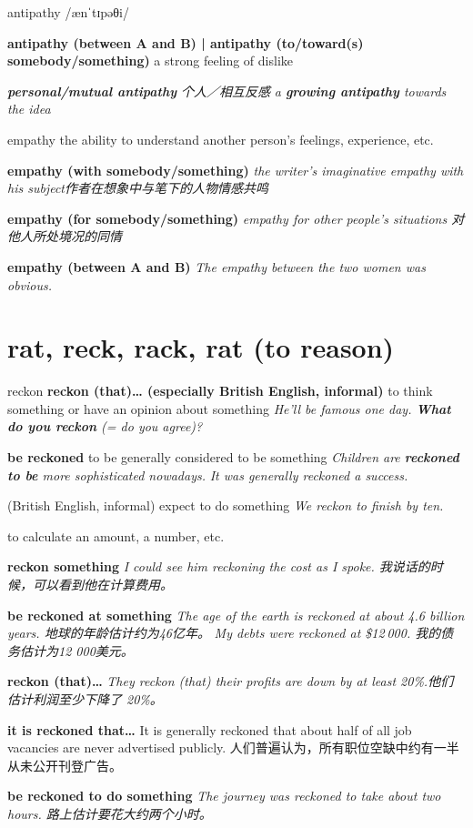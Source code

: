 \begin{DefWord}{antipathy}
    /ænˈtɪpəθi/

    \textbf{antipathy (between A and B) | antipathy (to/toward(s) somebody/something)} a strong feeling of dislike

    \textit{\textbf{personal/mutual antipathy} 个人／相互反感}
    \textit{a \textbf{growing antipathy} towards the idea}
\end{DefWord}

\begin{DefWord}{empathy}
    the ability to understand another person's feelings, experience, etc.

    \textbf{empathy (with somebody/something)} 
    \textit{the writer's imaginative empathy with his subject作者在想象中与笔下的人物情感共鸣}
 
    \textbf{empathy (for somebody/something) }
    \textit{empathy for other people's situations 对他人所处境况的同情}

    \textbf{empathy (between A and B)} 
    \textit{The empathy between the two women was obvious.}
\end{DefWord}

\section{rat, reck, rack, rat (to reason)}

\begin{DefWord}{reckon}
    \textbf{reckon (that)… (especially British English, informal)} to think something or have an opinion about something
    \textit{He'll be famous one day. \textbf{What do you reckon} (= do you agree)?}

    \textbf{be reckoned} to be generally considered to be something
    \textit{Children are \textbf{reckoned to be} more sophisticated nowadays.}
    \textit{It was generally reckoned a success.}

    (British English, informal) expect to do something
    \textit{We reckon to finish by ten.}

    to calculate an amount, a number, etc.

    \textbf{reckon something} 
    \textit{I could see him reckoning the cost as I spoke. 我说话的时候，可以看到他在计算费用。}

    \textbf{be reckoned at something} \textit{The age of the earth is reckoned at about 4.6 billion years. 地球的年龄估计约为46亿年。}
    \textit{My debts were reckoned at \$12 000. 我的债务估计为12 000美元。}

    \textbf{reckon (that)…} \textit{They reckon (that) their profits are down by at least 20\%.他们估计利润至少下降了 20\%。}

    \textbf{it is reckoned that…} It is generally reckoned that about half of all job vacancies are never advertised publicly. 人们普遍认为，所有职位空缺中约有一半从未公开刊登广告。

    \textbf{be reckoned to do something} \textit{The journey was reckoned to take about two hours. 路上估计要花大约两个小时。}
\end{DefWord}


